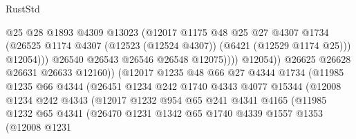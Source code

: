 \begin{lexlean}{RustStd}
\begin{coremodule}
                                      @25
                                      @28
                                      @1893
                                      @4309
                                      @13023
                                      (@12017
                                        @1175
                                        @48
                                        @25
                                        @27
                                        @4307
                                        @1734
                                        (@26525
                                          @1174
                                          @4307
                                          (@12523 (@12524 @4307))
                                          (@6421 (@12529 @1174 @25)))
                                        @12054)))
                                  @26540
                                  @26543
                                  @26546
                                  @26548
                                  @12075))))
                          @12054))
                      @26625
                      @26628
                      @26631
                      @26633
                      @12160))
                  (@12017
                    @1235
                    @48
                    @66
                    @27
                    @4344
                    @1734
                    (@11985
                      @1235
                      @66
                      @4344
                      (@26451
                        @1234
                        @242
                        @1740
                        @4343
                        @4077
                        @15344
                        (@12008
                          @1234
                          @242
                          @4343
                          (@12017
                            @1232
                            @954
                            @65
                            @241
                            @4341
                            @4165
                            (@11985
                              @1232
                              @65
                              @4341
                              (@26470
                                @1231
                                @1342
                                @65
                                @1740
                                @4339
                                @1557
                                @1353
                                (@12008
                                  @1231

\end{coremodule}
\end{lexlean}
